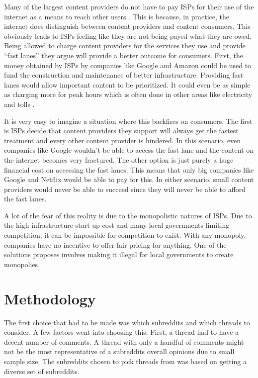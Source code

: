 \documentclass[11pt]{article}
\begin{document}
	Many of the largest content providers do not have to pay ISPs for their use of the internet as a means to reach other users \cite{lee2009subsidizing}. This is because, in practice, the internet does distinguish between content providers and content consumers. This obviously leads to ISPs feeling like they are not being payed what they are owed. Being allowed to charge content providers for the services they use and provide ``fast lanes'' they argue will provide a better outcome for consumers. First, the money obtained by ISPs by companies like Google and Amazon could be used to fund the construction and maintenance of better infrastructure. Providing fast lanes would allow important content to be prioritized. It could even be as simple as charging more for peak hours which is often done in other areas like electricity and tolls \cite{hahn2006economics}. 
	
	It is very easy to imagine a situation where this backfires on consumers. The first is ISPs decide that content providers they support will always get the fastest treatment and every other content provider is hindered. In this scenario, even companies like Google wouldn't be able to access the fast lane and the content on the internet becomes very fractured. The other option is just purely a huge financial cost on accessing the fast lanes. This means that only big companies like Google and Netflix would be able to pay for this. In either scenario, small content providers would never be able to succeed since they will never be able to afford the fast lanes. 
	
	A lot of the fear of this reality is due to the monopolistic natures of ISPs. Due to the high infrastructure start up cost and many local governments limiting competition, it can be impossible for competition to exist. With any monopoly, companies have no incentive to offer fair pricing for anything. One of the solutions \cite{hahn2006economics} proposes involves making it illegal for local governments to create monopolies. 
	\section{Methodology}\label{sec:method}
	The first choice that had to be made was which subreddits and which threads to consider. A few factors went into choosing this. First, a thread had to have a decent number of comments. A thread with only a handful of comments might not be the most representative of a subreddits overall opinions due to small sample size. The subreddits chosen to pick threads from was based on getting a diverse set of subreddits. 
	
\end{document}
